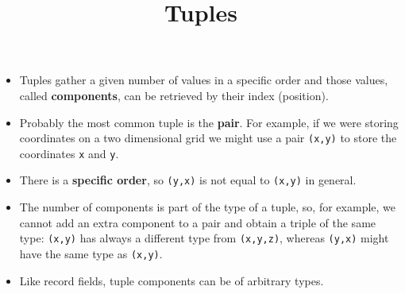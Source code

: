 \documentclass[wide]{slides}
\begin{document}
\begin{slide}
  \title{Tuples}

  \begin{itemize}

    \item Tuples gather a given number of values in a specific order
      and those values, called \textbf{components}, can be retrieved
      by their index (position).

    \item Probably the most common tuple is the \textbf{pair}. For
      example, if we were storing coordinates on a two dimensional
      grid we might use a pair \texttt{(x,y)} to store the coordinates
      \texttt{x} and \texttt{y}.

    \item There is a \textbf{specific order}, so \texttt{(y,x)} is not
      equal to \texttt{(x,y)} in general.

    \item The number of components is part of the type of a tuple, so,
      for example, we cannot add an extra component to a pair and
      obtain a triple of the same type: \texttt{(x,y)} has always a
      different type from \texttt{(x,y,z)}, whereas \texttt{(y,x)}
      might have the same type as \texttt{(x,y)}.

    \item Like record fields, tuple components can be of arbitrary
      types.

  \end{itemize}

\end{slide}
\end{document}
